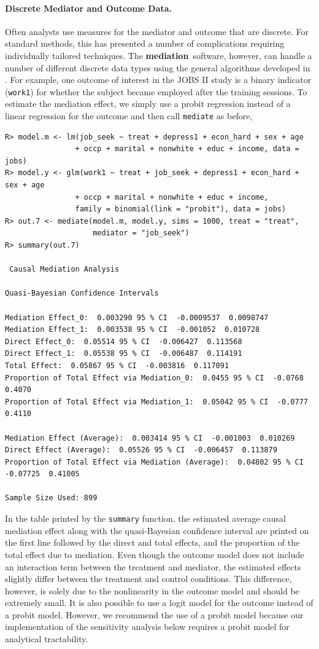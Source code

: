 \documentclass[11pt,letterpaper]{article}
\theoremstyle{plain}
\newcommand\bmediation{{\bf mediation}}
\begin{document}
\paragraph{Discrete Mediator and Outcome Data.}

Often analysts use measures for the mediator and outcome that are
discrete.  For standard methods, this has presented a number of
complications requiring individually tailored techniques.  The
\bmediation\ software, however, can handle a number of different
discrete data types using the general algorithms developed in
\citet{imai:keel:ting:10}.  For example, one outcome of interest in
the JOBS II study is a binary indicator (\texttt{work1}) for whether
the subject became employed after the training sessions. To estimate
the mediation effect, we simply use a probit regression instead of a
linear regression for the outcome and then call \texttt{mediate} as
before,
\begin{verbatim}
R> model.m <- lm(job_seek ~ treat + depress1 + econ_hard + sex + age 
                + occp + marital + nonwhite + educ + income, data = jobs)
R> model.y <- glm(work1 ~ treat + job_seek + depress1 + econ_hard + sex + age 
                + occp + marital + nonwhite + educ + income, 
                family = binomial(link = "probit"), data = jobs)
R> out.7 <- mediate(model.m, model.y, sims = 1000, treat = "treat",
                    mediator = "job_seek")
R> summary(out.7)

 Causal Mediation Analysis 

Quasi-Bayesian Confidence Intervals

Mediation Effect_0:  0.003290 95 % CI  -0.0009537  0.0098747 
Mediation Effect_1:  0.003538 95 % CI  -0.001052  0.010728 
Direct Effect_0:  0.05514 95 % CI  -0.006427  0.113568 
Direct Effect_1:  0.05538 95 % CI  -0.006487  0.114191 
Total Effect:  0.05867 95 % CI  -0.003816  0.117091 
Proportion of Total Effect via Mediation_0:  0.0455 95 % CI  -0.0768  0.4070 
Proportion of Total Effect via Mediation_1:  0.05042 95 % CI  -0.0777  0.4110 

Mediation Effect (Average):  0.003414 95 % CI  -0.001003  0.010269 
Direct Effect (Average):  0.05526 95 % CI  -0.006457  0.113879 
Proportion of Total Effect via Mediation (Average):  0.04802 95 % CI  -0.07725  0.41005 

Sample Size Used: 899 
\end{verbatim}

In the table printed by the \texttt{summary} function, the estimated
average causal mediation effect along with the quasi-Bayesian
confidence interval are printed on the first line followed by the
direct and total effects, and the proportion of the total effect due
to mediation.  Even though the outcome model does not include an interaction
term between the treatment and mediator, the estimated effects slightly differ
between the treatment and control conditions.  This difference, however, 
is solely due to the nonlinearity in the outcome model and should be
extremely small.  It is also possible to use a logit model for the
outcome instead of a probit model.  However, we recommend the use of a
probit model because our implementation of the sensitivity analysis
below requires a probit model for analytical tractability.
\end{document}

